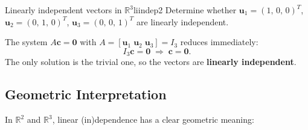 \documentclass[12pt,a4paper]{article}
\newcommand{\R}{\mathbb{R}}
\newcommand{\vv}[1]{\mathbf{#1}}
\newcommand{\vzero}{\mathbf{0}}
\begin{document}
		\begin{example}{Linearly independent vectors in $\R^3$}{liindep2}
			Determine whether
			$\vv{u}_1 = (1,\,0,\,0)^T$,
			$\vv{u}_2 = (0,\,1,\,0)^T$,
			$\vv{u}_3 = (0,\,0,\,1)^T$
			are linearly independent.
			
			The system $A\vv{c} = \vzero$ with
			$A = [\vv{u}_1\;\vv{u}_2\;\vv{u}_3] = I_3$ reduces immediately:
			\[
			I_3\vv{c} = \vzero \;\Longrightarrow\; \vv{c} = \vzero.
			\]
			The only solution is the trivial one, so the vectors are
			\textbf{linearly independent}.
		\end{example}
		
		\subsection{Geometric Interpretation}
		
		\noindent
		In $\R^2$ and $\R^3$, linear (in)dependence has a clear geometric meaning:
		
\end{document}
